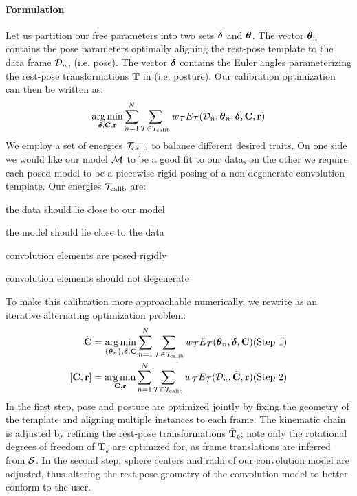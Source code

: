 \paragraph{Formulation}
Let us partition our free parameters into two sets $\boldsymbol{\delta}$ and $\boldsymbol{\theta}$. 
The vector $\boldsymbol{\theta}_n$ contains the pose parameters optimally aligning the rest-pose template to the data frame $\mathcal{D}_n$, (i.e. pose). 
The vector $\boldsymbol{\delta}$ contains the Euler angles parameterizing the rest-pose transformations $\mathbf{\bar{T}}$ in  (i.e. posture).
% 
Our calibration optimization can then be written as:
\begin{eqnarray}
\operatorname*{arg\,min}_{\boldsymbol{\delta}, {\mathbf{C}}, {\mathbf{r}}}
\sum_{n=1}^N 
\sum_{\mathcal{T} \in {\mathcal{T}_\text{calib}}} 
w_\mathcal{T} E_\mathcal{T}(\mathcal{D}_n, \boldsymbol{\theta}_n, \boldsymbol{\delta}, {\mathbf{C}}, {\mathbf{r}})
\label{eq:calibration}
\end{eqnarray}
% 
We employ a set of energies ${\mathcal{T}_\text{calib}}$ to balance different desired traits. On one side we would like our model $\mathcal{M}$ to be a good fit to our data, on the other we require each posed model to be a piecewise-rigid posing of a non-degenerate convolution template. Our energies ${\mathcal{T}_\text{calib}}$ are:
% 
\begin{description}[labelsep=0em,labelwidth=.4in,labelindent=1cm]
\item[d2m] the data should lie close to our model
\item[m2d] the model should lie close to the data
\item[rigid] convolution elements are posed rigidly
\item[valid] convolution elements should not degenerate
\end{description}
% 
To make this calibration more approachable numerically, we rewrite  as an iterative alternating optimization problem:
% 
\begin{eqnarray}
\tilde{{\mathbf{C}}} = 
\operatorname*{arg\,min}_{{\{\boldsymbol{\theta}_n\}},\boldsymbol{\delta},{\mathbf{C}}} 
\sum_{n=1}^N 
\sum_{\mathcal{T} \in {\mathcal{T}_\text{calib}}}
w_\mathcal{T} E_\mathcal{T}(\boldsymbol{\theta}_n, \boldsymbol{\delta}, {\mathbf{C}}) 
& \text{(Step 1)}
\label{eq:step1}
\\
\left[ {\mathbf{C}}, {\mathbf{r}} \right] =
\operatorname*{arg\,min}_{{\mathbf{C}}, {\mathbf{r}}} 
\sum_{n=1}^N 
\sum_{\mathcal{T} \in {\mathcal{T}_\text{calib}}}
w_\mathcal{T} E_\mathcal{T}(\mathcal{D}_n, \tilde{{\mathbf{C}}}, {\mathbf{r}})
& \text{(Step 2)}
\label{eq:step2}
\end{eqnarray}
% 
In the first step, pose and posture are optimized jointly by fixing the geometry of the template and aligning multiple instances to each frame. The kinematic chain is adjusted by refining the rest-pose transformations $\mathbf{\bar{T}}_k$; note only the rotational degrees of freedom of $\mathbf{\bar{T}}_k$ are optimized for, as frame translations are inferred from $\mathcal{S}$. 
% 
In the second step, sphere centers and radii of our convolution model are adjusted, thus altering the rest pose geometry of the convolution model to better conform to the user.

